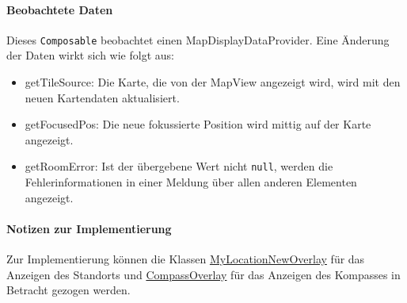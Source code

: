 \paragraph*{Beobachtete Daten}
Dieses \texttt{Composable} beobachtet einen MapDisplayDataProvider. 
Eine Änderung der Daten wirkt sich wie folgt aus:
\begin{itemize}
    \item getTileSource: Die Karte, die von der MapView angezeigt wird, wird mit den neuen 
    Kartendaten aktualisiert.
    \item getFocusedPos: Die neue fokussierte Position wird mittig auf der Karte angezeigt.
    \item getRoomError: Ist der übergebene Wert nicht \texttt{null}, werden die Fehlerinformationen 
    in einer Meldung über allen anderen Elementen angezeigt.
\end{itemize}

\paragraph*{Notizen zur Implementierung}
Zur Implementierung können die Klassen \href{https://osmdroid.github.io/osmdroid/javadocs/osmdroid-android/debug/org/osmdroid/views/overlay/mylocation/MyLocationNewOverlay.html}
{MyLocationNewOverlay} für das Anzeigen des Standorts und \href{https://osmdroid.github.io/osmdroid/javadocs/osmdroid-android/debug/org/osmdroid/views/overlay/compass/CompassOverlay.html}
{CompassOverlay} für das Anzeigen des Kompasses in Betracht gezogen werden.
